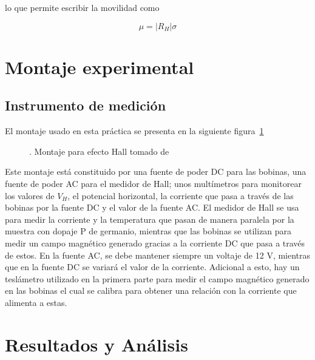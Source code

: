 \documentclass[%
 reprint,
 amsmath,amssymb,
 aps,
]{revtex4-1}
\begin{document}
lo que permite escribir la movilidad como 

\begin{equation}
    \mu=|R_H|\sigma
    \label{movilidad_hall}
\end{equation}

\section{Montaje experimental}
\subsection{Instrumento de medición}

El montaje usado en esta práctica se presenta en la siguiente figura~\ref{montaje Hall}

\begin{figure}[h]
\caption{\label{montaje Hall}. Montaje para efecto Hall tomado de~\cite{guia hall}}
\end{figure}

Este montaje está constituido por una fuente de poder DC para las bobinas, una fuente de poder AC para el medidor de Hall; unos multímetros para monitorear los valores de $V_H$, el potencial horizontal, la corriente que pasa a través de las bobinas por la fuente DC y el valor de la fuente AC. El medidor de Hall se usa para medir la corriente y la temperatura que pasan de manera paralela por la muestra con dopaje P de germanio, mientras que las bobinas se utilizan para medir un campo magnético generado gracias a la corriente DC que pasa a través de estos. En la fuente AC, se debe mantener siempre un voltaje de 12 V, mientras que en la fuente DC se variará el valor de la corriente. Adicional a esto, hay un teslámetro utilizado en la primera parte para medir el campo magnético generado en las bobinas el cual se calibra para obtener una relación con la corriente que alimenta a estas.
\section{Resultados y Análisis}
\end{document}
